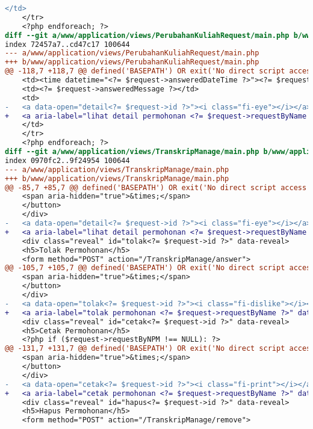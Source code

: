 \begin{lstlisting}[frame=single, label={lst:perbaikan_2.4.4_tautan_tanpa_keterangan}, language=diff, caption=Perbaikan Kriteria Sukses 2.4.4 - Tautan Tanpa Keterangan]
    </td>
    </tr>
    <?php endforeach; ?>
diff --git a/www/application/views/PerubahanKuliahRequest/main.php b/www/application/views/PerubahanKuliahRequest/main.php
index 72457a7..cd47c17 100644
--- a/www/application/views/PerubahanKuliahRequest/main.php
+++ b/www/application/views/PerubahanKuliahRequest/main.php
@@ -118,7 +118,7 @@ defined('BASEPATH') OR exit('No direct script access allowed');
    <td><time datetime="<?= $request->answeredDateTime ?>"><?= $request->answeredDateString ?></time></td>
    <td><?= $request->answeredMessage ?></td>
    <td>
-   <a data-open="detail<?= $request->id ?>"><i class="fi-eye"></i></a>
+   <a aria-label="lihat detail permohonan <?= $request->requestByName ?>" data-open="detail<?= $request->id ?>"><i class="fi-eye"></i></a>
    </td>
    </tr>
    <?php endforeach; ?>
diff --git a/www/application/views/TranskripManage/main.php b/www/application/views/TranskripManage/main.php
index 0970fc2..9f24954 100644
--- a/www/application/views/TranskripManage/main.php
+++ b/www/application/views/TranskripManage/main.php
@@ -85,7 +85,7 @@ defined('BASEPATH') OR exit('No direct script access allowed');
    <span aria-hidden="true">&times;</span>
    </button>                                        
    </div>
-   <a data-open="detail<?= $request->id ?>"><i class="fi-eye"></i></a>
+   <a aria-label="lihat detail permohonan <?= $request->requestByName ?>" data-open="detail<?= $request->id ?>"><i class="fi-eye"></i></a>
    <div class="reveal" id="tolak<?= $request->id ?>" data-reveal>
    <h5>Tolak Permohonan</h5>
    <form method="POST" action="/TranskripManage/answer">
@@ -105,7 +105,7 @@ defined('BASEPATH') OR exit('No direct script access allowed');
    <span aria-hidden="true">&times;</span>
    </button>
    </div>
-   <a data-open="tolak<?= $request->id ?>"><i class="fi-dislike"></i></a>
+   <a aria-label="tolak permohonan <?= $request->requestByName ?>" data-open="tolak<?= $request->id ?>"><i class="fi-dislike"></i></a>
    <div class="reveal" id="cetak<?= $request->id ?>" data-reveal>
    <h5>Cetak Permohonan</h5>
    <?php if ($request->requestByNPM !== NULL): ?>
@@ -131,7 +131,7 @@ defined('BASEPATH') OR exit('No direct script access allowed');
    <span aria-hidden="true">&times;</span>
    </button>
    </div>
-   <a data-open="cetak<?= $request->id ?>"><i class="fi-print"></i></a>
+   <a aria-label="cetak permohonan <?= $request->requestByName ?>" data-open="cetak<?= $request->id ?>"><i class="fi-print"></i></a>
    <div class="reveal" id="hapus<?= $request->id ?>" data-reveal>
    <h5>Hapus Permohonan</h5>
    <form method="POST" action="/TranskripManage/remove">

\end{lstlisting}
